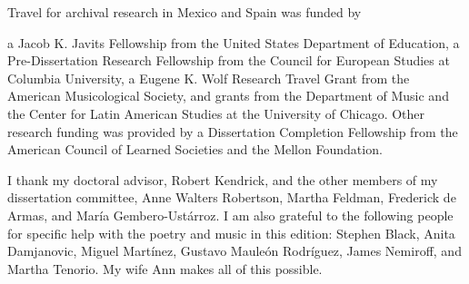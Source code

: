 Travel for archival research in Mexico and Spain was funded by 
\begin{anonymize}
a Jacob K. Javits Fellowship from the United States Department of Education, 
a Pre-Dissertation Research Fellowship from the Council for European Studies at Columbia University, 
a Eugene K. Wolf Research Travel Grant from the American Musicological Society, 
and grants from the Department of Music and the Center for Latin American Studies at the University of Chicago.
Other research funding was provided by a Dissertation Completion Fellowship from the American Council of Learned Societies and the Mellon Foundation.

I thank my doctoral advisor, Robert Kendrick, and the other members of my dissertation committee, Anne Walters Robertson, Martha Feldman, Frederick de Armas, and María Gembero-Ustárroz.
I am also grateful to the following people for specific help with the poetry and music in this edition:
Stephen Black,
Anita Damjanovic, 
Miguel Martínez, 
Gustavo Mauleón Rodríguez,
James Nemiroff, and
Martha Tenorio.
My wife Ann makes all of this possible.
\end{anonymize}
